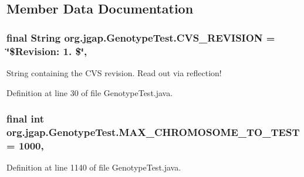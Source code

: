 \subsection{Member Data Documentation}
\hypertarget{classorg_1_1jgap_1_1_genotype_test_a86c929024ec35824095bbe1491801fb6}{
\subsubsection[{C\-V\-S\-\_\-\-R\-E\-V\-I\-S\-I\-O\-N}]{\setlength{\rightskip}{0pt plus 5cm}final String org.\-jgap.\-Genotype\-Test.\-C\-V\-S\-\_\-\-R\-E\-V\-I\-S\-I\-O\-N = \char`\"{}\$Revision\-: 1. \$\char`\"{}\hspace{0.3cm}{\ttfamily [static]}, {\ttfamily [private]}}}\label{classorg_1_1jgap_1_1_genotype_test_a86c929024ec35824095bbe1491801fb6}
String containing the C\-V\-S revision. Read out via reflection! 

Definition at line 30 of file Genotype\-Test.\-java.

\hypertarget{classorg_1_1jgap_1_1_genotype_test_a1f3e7c6a2b19f5281bd339427fd07a7c}{
\subsubsection[{M\-A\-X\-\_\-\-C\-H\-R\-O\-M\-O\-S\-O\-M\-E\-\_\-\-T\-O\-\_\-\-T\-E\-S\-T}]{\setlength{\rightskip}{0pt plus 5cm}final int org.\-jgap.\-Genotype\-Test.\-M\-A\-X\-\_\-\-C\-H\-R\-O\-M\-O\-S\-O\-M\-E\-\_\-\-T\-O\-\_\-\-T\-E\-S\-T = 1000\hspace{0.3cm}{\ttfamily [static]}, {\ttfamily [private]}}}\label{classorg_1_1jgap_1_1_genotype_test_a1f3e7c6a2b19f5281bd339427fd07a7c}


Definition at line 1140 of file Genotype\-Test.\-java.



